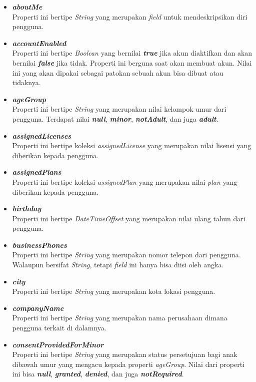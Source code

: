 \begin{itemize}
	\item \textbf{\textit{aboutMe}}\\
	Properti ini bertipe \textit{String} yang merupakan \textit{field} untuk mendeskripsikan diri pengguna. 
	\item \textbf{\textit{accountEnabled}}\\
	Properti ini bertipe \textit{Boolean} yang bernilai \textbf{\textit{true}} jika akun diaktifkan dan akan bernilai \textbf{\textit{false}} jika tidak. Properti ini berguna saat akan membuat akun. Nilai ini yang akan dipakai sebagai patokan sebuah akun bisa dibuat atau tidaknya. 
	\item \textbf{\textit{ageGroup}}\\
	Properti ini bertipe \textit{String} yang merupakan nilai kelompok umur dari pengguna. Terdapat nilai \textbf{\textit{null}}, \textbf{\textit{minor}}, \textbf{\textit{notAdult}}, dan juga \textbf{\textit{adult}}.
	\item \textbf{\textit{assignedLicenses}}\\
	Properti ini bertipe koleksi \textit{assignedLicense} yang merupakan nilai lisensi yang diberikan kepada pengguna.
	\item \textbf{\textit{assignedPlans}}\\
	Properti ini bertipe koleksi \textit{assignedPlan} yang merupakan nilai \textit{plan} yang diberikan kepada pengguna.
	\item \textbf{\textit{birthday}}\\
	Properti ini bertipe \textit{DateTimeOffset} yang merupakan nilai ulang tahun dari pengguna. 
	\item \textbf{\textit{businessPhones}}\\
	Properti ini bertipe \textit{String} yang merupakan nomor telepon dari pengguna. Walaupun bersifat \textit{String}, tetapi \textit{field} ini hanya bisa diisi oleh angka.
	\item \textbf{\textit{city}}\\
	Properti ini bertipe \textit{String} yang merupakan kota lokasi pengguna.
	\item \textbf{\textit{companyName}}\\
	Properti ini bertipe \textit{String} yang merupakan nama perusahaan dimana pengguna terkait di dalamnya.
	\item \textbf{\textit{consentProvidedForMinor}}\\
	Properti ini bertipe \textit{String} yang merupakan status persetujuan bagi anak dibawah umur yang mengacu kepada properti \textit{ageGroup}. Nilai dari properti ini bisa \textbf{\textit{null}}, \textbf{\textit{granted}}, \textbf{\textit{denied}}, dan juga \textbf{\textit{notRequired}}. 

\end{itemize}
